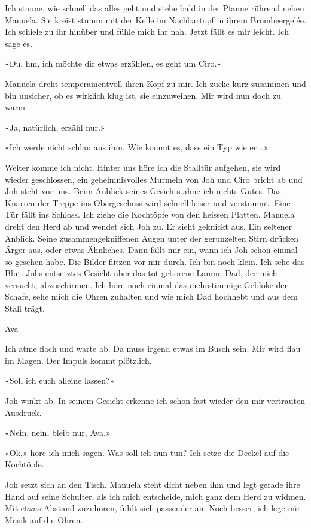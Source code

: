 Ich staune, wie schnell das alles geht und stehe bald in der Pfanne
rührend neben Manuela. Sie kreist stumm mit der Kelle im Nachbartopf in
ihrem Brombeergelée. Ich schiele zu ihr hinüber und fühle mich ihr nah.
Jetzt fällt es mir leicht. Ich sage es.

«Du, hm, ich möchte dir etwas erzählen, es geht um Ciro.»

Manuela dreht temperamentvoll ihren Kopf zu mir. Ich zucke kurz zusammen
und bin unsicher, ob es wirklich klug ist, sie einzuweihen. Mir wird nun
doch zu warm.

«Ja, natürlich, erzähl nur.»

«Ich werde nicht schlau aus ihm. Wie kommt es, dass ein Typ wie er...»

Weiter komme ich nicht. Hinter uns höre ich die Stalltür aufgehen, sie
wird wieder geschlossen, ein geheimnisvolles Murmeln von Joh und Ciro
bricht ab und Joh steht vor uns. Beim Anblick seines Gesichts ahne ich
nichts Gutes. Das Knarren der Treppe ins Obergeschoss wird schnell
leiser und verstummt. Eine Tür fällt ins Schloss. Ich ziehe die
Kochtöpfe von den heissen Platten. Manuela dreht den Herd ab und wendet
sich Joh zu. Er sieht geknickt aus. Ein seltener Anblick. Seine
zusammengekniffenen Augen unter der gerunzelten Stirn drücken Ärger aus,
oder etwas Ähnliches. Dann fällt mir ein, wann ich Joh schon einmal so
gesehen habe. Die Bilder flitzen vor mir durch. Ich bin noch klein. Ich
sehe das Blut. Johs entsetztes Gesicht über das tot geborene Lamm. Dad,
der mich versucht, abzuschirmen. Ich höre noch einmal das mehrstimmige
Geblöke der Schafe, sehe mich die Ohren zuhalten und wie mich Dad
hochhebt und aus dem Stall trägt.

Ava

Ich atme flach und warte ab. Da muss irgend etwas im Busch sein. Mir
wird flau im Magen. Der Impuls kommt plötzlich.

«Soll ich euch alleine lassen?»

Joh winkt ab. In seinem Gesicht erkenne ich schon fast wieder den mir
vertrauten Ausdruck.

«Nein, nein, bleib nur, Ava.»

«Ok,» höre ich mich sagen. Was soll ich nun tun? Ich setze die Deckel
auf die Kochtöpfe.

Joh setzt sich an den Tisch. Manuela steht dicht neben ihm und legt
gerade ihre Hand auf seine Schulter, als ich mich entscheide, mich ganz
dem Herd zu widmen. Mit etwas Abstand zuzuhören, fühlt sich passender
an. Noch besser, ich lege mir Musik auf die Ohren.

